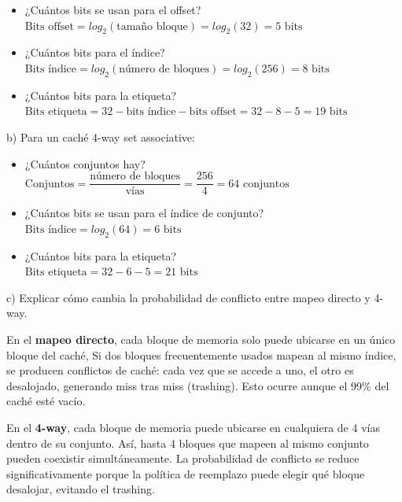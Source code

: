 \documentclass[a4paper, 11pt]{article}
\newcommand{\Aspace}{0.2cm}
\begin{document}
\begin{enumerate}
\begin{itemize}
        \item ¿Cuántos bits se usan para el offset?
        \\ { \color{azul} 
            $\text{Bits offset} = log_{2}(\text{tamaño bloque}) = log_{2}(32) = 5 \text{ bits}$
        }

        \item ¿Cuántos bits para el índice?
        \\ { \color{azul} 
            $\text{Bits índice} = log_{2}(\text{número de bloques}) = log_{2}(256) = 8 \text{ bits}$
        }

        \item ¿Cuántos bits para la etiqueta?
        \\ { \color{azul} 
            $\text{Bits etiqueta} = 32 - \text{bits índice} - \text{bits offset} = 32 - 8 - 5 = 19 \text{ bits}$
        }
    \end{itemize}

    \vspace{\Aspace} \par
    b) Para un caché 4-way set associative:
    \begin{itemize}
        \item ¿Cuántos conjuntos hay?
        \\ { \color{azul} 
            $\text{Conjuntos} = \dfrac{\text{número de bloques}}{\text{vías}} = \dfrac{256}{4} = 64 \text{ conjuntos}$
        }

        \item ¿Cuántos bits se usan para el índice de conjunto?
        \\ { \color{azul}
            $\text{Bits índice} = log_{2}(64) = 6 \text{ bits}$
        }

        \item ¿Cuántos bits para la etiqueta?
        \\ { \color{azul} 
            $\text{Bits etiqueta} = 32 - 6 - 5 = 21 \text{ bits}$
        }
    \end{itemize}

    \vspace{\Aspace} \par
    c) Explicar cómo cambia la probabilidad de conflicto entre mapeo directo y 4-way.
    \\ { \color{azul} 
        En el \textbf{mapeo directo}, cada bloque de memoria solo puede ubicarse en un único bloque del caché,
        Si dos bloques frecuentemente usados mapean al mismo índice, se producen conflictos de caché: 
        cada vez que se accede a uno, el otro es desalojado, generando miss tras miss (trashing).
        Esto ocurre aunque el 99\% del caché esté vacío. \par
        En el \textbf{4-way}, cada bloque de memoria puede ubicarse en cualquiera de 4 vías dentro de su conjunto.
        Así, hasta 4 bloques que mapeen al mismo conjunto pueden coexistir simultáneamente. 
        La probabilidad de conflicto se reduce significativamente porque la política de reemplazo puede elegir qué bloque desalojar, evitando el trashing.
    }



\end{enumerate}
\end{document}
